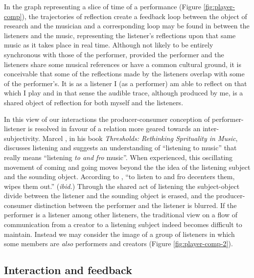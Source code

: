 In the graph representing a slice of time of a performance (Figure \ref{fig:player-comp}), the trajectories of reflection create a feedback loop between the object of research and the musician and a corresponding loop may be found in between the listeners and the music, representing the listener's reflections upon that same music as it takes place in real time. Although not likely to be entirely synchronous with those of the performer, provided the performer and the listeners share some musical references or have a common cultural ground, it is conceivable that some of the reflections made by the listeners overlap with some of the performer's. It is as a listener I (as a performer) am able to reflect on that which I play and in that sense the audible trace, although produced by me, is a shared object of reflection for both myself and the listeners. 

In this view of our interactions the producer-consumer conception of performer-listener is resolved in favour of a relation more geared towards an  inter-subjectivity. Marcel \citeauthor{cobussen08}, in his book \emph{Thresholds: Rethinking Sprituality in Music}, discusses listening and suggests an understanding of ``listening to music'' that really means ``listening \emph{to and fro} music''. \citep[135 (italics by the author)]{cobussen08} When experienced, this oscillating movement of coming and going moves beyond the the idea of the listening subject and the sounding object. According to \citeauthor{cobussen08}, ``to listen to and fro decenters them, wipes them out.'' (\emph{ibid.}) Through the shared act of listening the subject-object divide between the listener and the sounding object is erased, and the producer-consumer distinction between the performer and the listener is blurred. 
If the performer is a listener among other listeners, the traditional view on a flow of communication from a creator to a listening subject indeed becomes difficult to maintain. Instead we may consider the image of a group of listeners in which some members are \emph{also} performers and creators (Figure \ref{fig:player-comp-2}). %

\subsection*{Interaction and feedback}
\label{sec:interaction-feedback}

